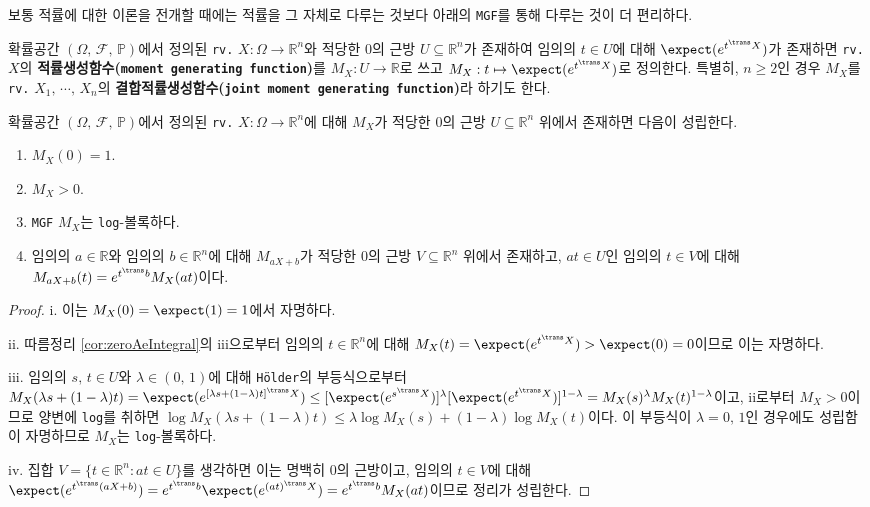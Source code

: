 보통 적률에 대한 이론을 전개할 때에는 적률을 그 자체로 다루는 것보다 아래의 \texttt{MGF}를 통해 다루는 것이 더 편리하다.

\begin{definition}
    확률공간 $(\Omega,\,\mathcal{F},\,\mathbb{P})$에서 정의된 \texttt{rv.} $X:\Omega\to\mathbb{R}^n$와 적당한 $0$의 근방 $U\subseteq\mathbb{R}^n$가 존재하여 임의의 $t\in U$에 대해 $\expect(e^{t^\trans X})$가 존재하면 \texttt{rv.} $X$의 \textbf{적률생성함수(\texttt{moment generating function})}를 $M_X:U\to\mathbb{R}$로 쓰고 $M_X:t\mapsto\expect(e^{t^\trans X})$로 정의한다. 특별히, $n\geq2$인 경우 $M_X$를 \texttt{rv.} $X_1,\,\cdots,\,X_n$의 \textbf{결합적률생성함수(\texttt{joint moment generating function})}라 하기도 한다.
\end{definition}

\begin{theorem}\label{thm:MGFProp}
    확률공간 $(\Omega,\,\mathcal{F},\,\mathbb{P})$에서 정의된 \texttt{rv.} $X:\Omega\to\mathbb{R}^n$에 대해 $M_X$가 적당한 $0$의 근방 $U\subseteq\mathbb{R}^n$ 위에서 존재하면 다음이 성립한다.
    \begin{enumerate}
        \item $M_X(0)=1$.
        \item $M_X>0$.
        \item \texttt{MGF} $M_X$는 \texttt{log}-볼록하다.
        \item 임의의 $a\in\mathbb{R}$와 임의의 $b\in\mathbb{R}^n$에 대해 $M_{aX+b}$가 적당한 $0$의 근방 $V\subseteq\mathbb{R}^n$ 위에서 존재하고, $at\in U$인 임의의 $t\in V$에 대해 $M_{aX+b}(t)=e^{t^\trans b}M_X(at)$이다.
    \end{enumerate}
\end{theorem}

\begin{proof}
    i. 이는 $M_X(0)=\expect(1)=1$에서 자명하다.

    ii. 따름정리 \ref{cor:zeroAeIntegral}의 iii으로부터 임의의 $t\in\mathbb{R}^n$에 대해 $M_X(t)=\expect(e^{t^\trans X})>\expect(0)=0$이므로 이는 자명하다.

    iii. 임의의 $s,\,t\in U$와 $\lambda\in(0,\,1)$에 대해 \texttt{H\"older}의 부등식으로부터 $M_X(\lambda s+(1-\lambda)t)=\expect(e^{[\lambda s+(1-\lambda)t]^\trans X})\leq[\expect(e^{s^\trans X})]^\lambda[\expect(e^{t^\trans X})]^{1-\lambda}=M_X(s)^\lambda M_X(t)^{1-\lambda}$이고, ii로부터 $M_X>0$이므로 양변에 \texttt{log}를 취하면 $\log M_X(\lambda s+(1-\lambda)t)\leq\lambda\log M_X(s)+(1-\lambda)\log M_X(t)$이다. 이 부등식이 $\lambda=0,\,1$인 경우에도 성립함이 자명하므로 $M_X$는 \texttt{log}-볼록하다.

    iv. 집합 $V=\{t\in\mathbb{R}^n:at\in U\}$를 생각하면 이는 명백히 $0$의 근방이고, 임의의 $t\in V$에 대해 $\expect(e^{t^\trans(aX+b)})=e^{t^\trans b}\expect(e^{(at)^\trans X})=e^{t^\trans b}M_X(at)$이므로 정리가 성립한다.
\end{proof}

